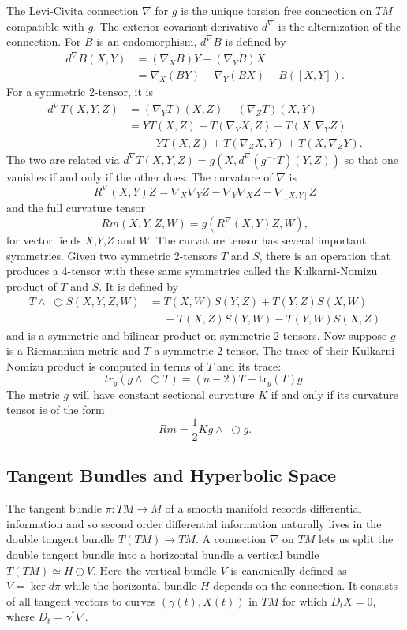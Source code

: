\documentclass{amsart}
\newcommand{\tr}{\mathrm{tr}}
\newcommand{\wtimes}{\wedge \!\!\!\!\!\!\!\!\;\bigcirc}
\begin{document}
The Levi-Civita connection $\nabla$ for $g$ is the unique torsion free connection on $TM$ compatible with $g$.
The exterior covariant derivative $d^\nabla$ is the alternization of the connection.
For $B$ is an endomorphism, $d^\nabla B$ is defined by
\begin{align*}
d^\nabla B(X,Y) &= (\nabla_XB)Y - (\nabla_YB)X \\
&= \nabla_X(BY)- \nabla_Y(BX) - B([X,Y]).
\end{align*}
For a symmetric 2-tensor, it is 
\begin{align*}
d^\nabla T(X,Y,Z)
&= (\nabla_YT)(X,Z)- (\nabla_Z T)(X,Y) \\
&= YT(X,Z) - T(\nabla_YX,Z) - T(X,\nabla_YZ) \\
&\phantom{=} - YT(X,Z) + T(\nabla_ZX,Y) + T(X,\nabla_ZY).
\end{align*}
The two are related via $d^\nabla T(X,Y,Z) = g(X, d^\nabla(g^{-1}T)(Y,Z))$ so that one vanishes if and only if the other does.
The curvature of $\nabla$ is 
\[
R^\nabla(X,Y)Z = \nabla_X\nabla_Y Z - \nabla_Y\nabla_X Z - \nabla_{[X,Y]}Z
\]
and the full curvature tensor 
\[
Rm(X,Y,Z,W) = g(R^\nabla(X,Y)Z,W),
\]
for vector fields $X$,$Y$,$Z$ and $W$.
The curvature tensor has several important symmetries.
Given two symmetric 2-tensors $T$ and $S$, there is an operation that produces a 4-tensor with these same symmetries called the Kulkarni-Nomizu product of $T$ and $S$. 
It is defined by
\begin{align*}
T \wtimes S(X,Y,Z,W)
&= T(X,W)S(Y,Z) + T(Y,Z)S(X,W) \\
&\phantom{=} - T(X,Z)S(Y,W) - T(Y,W)S(X,Z)
\end{align*}
and is a symmetric and bilinear product on symmetric 2-tensors.
Now suppose $g$ is a Riemannian metric and $T$ a symmetric 2-tensor.
The trace of their Kulkarni-Nomizu product is computed in terms of $T$ and its trace:
\[
tr_g( g \wtimes T) = (n-2)T + \tr_g(T)g.
\]
The metric $g$ will have constant sectional curvature $K$ if and only if its curvature tensor is of the form 
\[
Rm = \frac{1}{2}K g \wtimes g.
\]

\subsection{Tangent Bundles and Hyperbolic Space}

The tangent bundle $\pi:TM \to M$ of a smooth manifold records differential information and so second order differential information naturally lives in the double tangent bundle $T(TM) \to TM$.
A connection $\nabla$ on $TM$ lets us split the double tangent bundle into a horizontal bundle a vertical bundle $T(TM) \simeq H \oplus V$.
Here the vertical bundle $V$ is canonically defined as $V = \ker d\pi$ while the horizontal bundle $H$ depends on the connection.
It consists of all tangent vectors to curves $(\gamma(t),X(t))$ in $TM$ for which $D_tX = 0$, where $D_t = \gamma^*\nabla$.
\end{document}
